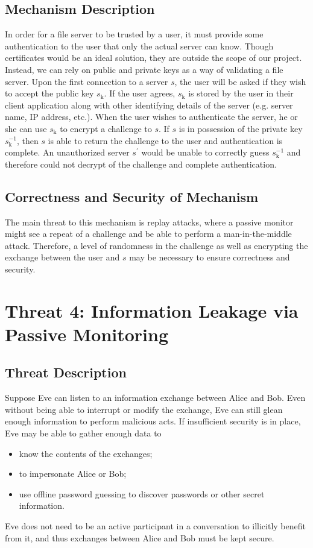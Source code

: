 \documentclass[11pt]{article}
\begin{document}
\subsection{Mechanism Description}
In order for a file server to be trusted by a user, it must provide some authentication to the user that only the actual server can know. Though certificates would be an ideal solution, they are outside the scope of our project. Instead, we can rely on public and private keys as a way of validating a file server. Upon the first connection to a server $s$, the user will be asked if they wish to accept the public key $s_\text{k}$. If the user agrees, $s_\text{k}$ is stored by the user in their client application along with other identifying details of the server (e.g. server name, IP address, etc.). When the user wishes to authenticate the server, he or she can use $s_\text{k}$ to encrypt a challenge to $s$. If $s$ is in possession of the private key $s_\text{k}^{-1}$, then $s$ is able to return the challenge to the user and authentication is complete. An unauthorized server $s^\prime$ would be unable to correctly guess $s_\text{k}^{-1}$ and therefore could not decrypt of the challenge and complete authentication.
\subsection{Correctness and Security of Mechanism}
The main threat to this mechanism is replay attacks, where a passive monitor might see a repeat of a challenge and be able to perform a man-in-the-middle attack. Therefore, a level of randomness in the challenge as well as encrypting the exchange between the user and $s$ may be necessary to ensure correctness and security.
\section{Threat 4: Information Leakage via Passive Monitoring}
\subsection{Threat Description}
Suppose Eve can listen to an information exchange between Alice and Bob. Even without being able to interrupt or modify the exchange, Eve can still glean enough information to perform malicious acts. If insufficient security is in place, Eve may be able to gather enough data to
\begin{itemize}
\item know the contents of the exchanges;
\item to impersonate Alice or Bob;
\item use offline password guessing to discover passwords or other secret information.
\end{itemize}
Eve does not need to be an active participant in a conversation to illicitly benefit from it, and thus exchanges between Alice and Bob must be kept secure.
\end{document}
